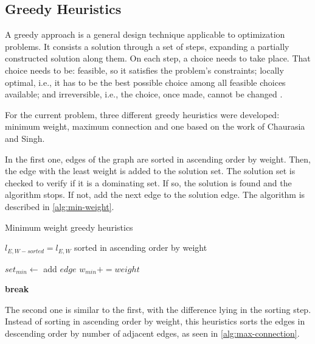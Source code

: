 \subsection{Greedy Heuristics}
A greedy approach is a general design technique applicable to optimization problems.
It consists a solution through a set of steps, expanding a partially constructed solution along them.
On each step, a choice needs to take place.
That choice needs to be: feasible, so it satisfies the problem's constraints; locally optimal, i.e., it has to be the best possible choice among all feasible choices available; and irreversible, i.e., the choice, once made, cannot be changed \cite{levitin2012introduction}.

For the current problem, three different greedy heuristics were developed: minimum weight, maximum connection and one based on the work of Chaurasia and Singh\cite{chaurasia}.

In the first one, edges of the graph are sorted in ascending order by weight. 
Then, the edge with the least weight is added to the solution set.
The solution set is checked to verify if it is a dominating set.
If so, the solution is found and the algorithm stops.
If not, add the next edge to the solution edge.
The algorithm is described in \autoref{alg:min-weight}. 

\begin{algorithm}
\caption{Minimum weight greedy heuristics}
\label{alg:min-weight}
\begin{algorithmic}


\State $l_{E,W-sorted} = l_{E,W}$ sorted in ascending order by weight

    \State $set_{min} \gets$ add $edge$
    \State $w_{min} += weight$

        \State \textbf{break}
    \EndIf
\EndFor
\end{algorithmic}
\end{algorithm}

The second one is similar to the first, with the difference lying in the sorting step.
Instead of sorting in ascending order by weight, this heuristics sorts the edges in descending order by number of adjacent edges, as seen in \autoref{alg:max-connection}.

